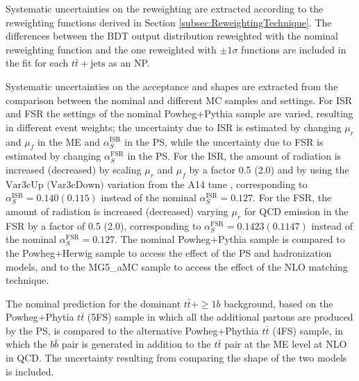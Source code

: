 \begin{description}
    Systematic uncertainties on the reweighting are extracted according to the reweighting functions derived in Section \ref{subsec:ReweightingTechnique}. The differences between the BDT output distribution reweighted with the nominal reweighting function and the one reweighted with ${\pm}1{\sigma}$ functions are included in the fit for each $t\bar{t}+\text{jets}$ as an NP.
    
    Systematic uncertainties on the acceptance and shapes are extracted from the comparison between the nominal and different MC samples and settings. For ISR and FSR the settings of the nominal Powheg+Pythia sample are varied, resulting in different event weights; the uncertainty due to ISR is estimated by changing $\mu_{r}$ and $\mu_{f}$ in the ME and $\alpha_{S}^{\text{ISR}}$ in the PS, while the uncertainty due to FSR is estimated by changing $\alpha_{S}^{\text{FSR}}$ in the PS. For the ISR, the amount of radiation is increased (decreased) by scaling $\mu_{r}$ and $\mu_{f}$ by a factor 0.5 (2.0) and by using the $\text{Var3cUp (Var3cDown)}$ variation from the A14 tune \cite{ATL-PHYS-PUB-2014-021}, corresponding to $\alpha_{S}^{\text{ISR}}=0.140(0.115)$ instead of the nominal $\alpha_{S}^{\text{ISR}}=0.127$. For the FSR, the amount of radiation is increased (decreased) varying $\mu_{r}$ for QCD emission in the FSR by a factor of 0.5 (2.0), corresponding to $\alpha_{S}^{\text{FSR}}=0.1423(0.1147)$ instead of the nominal $\alpha_{S}^{\text{FSR}}=0.127$. The nominal Powheg+Pythia sample is compared to the Powheg+Herwig sample to access the effect of the PS and hadronization models, and to the MG5\_aMC sample to access the effect of the NLO matching technique.

    The nominal prediction for the dominant $t\bar{t}+\geq1b$ background, based on the Powheg+Phytia $t\bar{t}$ (5FS) sample in which all the additional partons are produced by the PS, is compared to the alternative Powheg+Phythia $t\bar{t}$ (4FS) sample, in which the $b\bar{b}$ pair is generated in addition to the $t\bar{t}$ pair at the ME level at NLO in QCD. The uncertainty resulting from comparing the shape of the two models is included.

    
\end{description}

